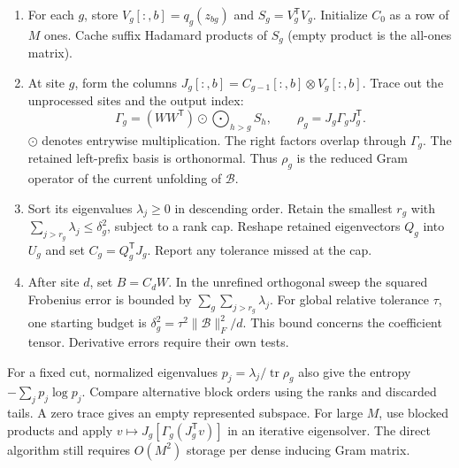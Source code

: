 \documentclass[11pt,a4paper]{article}
\newcommand{\T}{\mathsf T}\newcommand{\tr}{\operatorname{tr}}
\begin{document}
\begin{enumerate}
\item For each $g$, store $V_g[:,b]=q_g(z_{bg})$ and $S_g=V_g^\T V_g$. Initialize $C_0$ as a row of $M$ ones. Cache suffix Hadamard products of $S_g$ (empty product is the all-ones matrix).
\item At site $g$, form the columns $J_g[:,b]=C_{g-1}[:,b]\otimes V_g[:,b]$. Trace out the unprocessed sites and the output index:
\begin{equation}
 \Gamma_g=(WW^\T)\odot\!\!\bigodot_{h>g}\! S_h,\qquad
 \rho_g=J_g\Gamma_gJ_g^\T . \label{eq:density}
\end{equation}
$\odot$ denotes entrywise multiplication. The right factors overlap through $\Gamma_g$. The retained left-prefix basis is orthonormal. Thus $\rho_g$ is the reduced Gram operator of the current unfolding of $\mathcal B$.
\item Sort its eigenvalues $\lambda_j\ge0$ in descending order. Retain the smallest $r_g$ with $\sum_{j>r_g}\lambda_j\le\delta_g^2$, subject to a rank cap. Reshape retained eigenvectors $Q_g$ into $U_g$ and set $C_g=Q_g^\T J_g$. Report any tolerance missed at the cap.
\item After site $d$, set $B=C_dW$. In the unrefined orthogonal sweep the squared Frobenius error is bounded by $\sum_g\sum_{j>r_g}\lambda_j$. For global relative tolerance $\tau$, one starting budget is $\delta_g^2=\tau^2\|\mathcal B\|_F^2/d$. This bound concerns the coefficient tensor. Derivative errors require their own tests.
\end{enumerate}
For a fixed cut, normalized eigenvalues $p_j=\lambda_j/\tr\rho_g$ also give the entropy $-\sum_jp_j\log p_j$. Compare alternative block orders using the ranks and discarded tails. A zero trace gives an empty represented subspace. For large $M$, use blocked products and apply $v\mapsto J_g[\Gamma_g(J_g^\T v)]$ in an iterative eigensolver. The direct algorithm still requires $O(M^2)$ storage per dense inducing Gram matrix.
\end{document}
